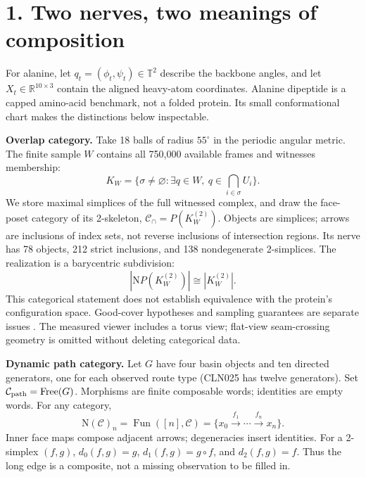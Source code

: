 \documentclass[11pt]{article}
\newcommand{\Cat}{\mathcal C}
\newcommand{\N}{\mathrm N}
\newcommand{\R}{\mathbb R}
\newcommand{\T}{\mathbb T}
\begin{document}

\newpage
\section*{1. Two nerves, two meanings of composition}
For alanine, let $q_t=(\phi_t,\psi_t)\in\T^2$ describe the backbone angles, and let
$X_t\in\R^{10\times3}$ contain the aligned heavy-atom coordinates.
Alanine dipeptide is a capped amino-acid benchmark, not a folded protein.
Its small conformational chart makes the distinctions below inspectable.

\textbf{Overlap category.}
Take 18 balls of radius $55^\circ$ in the periodic angular metric. The finite
sample $W$ contains all 750,000 available frames and witnesses membership:
\[
 K_W=\{\sigma\ne\varnothing:\exists q\in W,\ q\in\bigcap_{i\in\sigma}U_i\}.
\]
We store maximal simplices of the full witnessed complex, and draw the
face-poset category of its 2-skeleton,
$\Cat_{\cap}=P(K_W^{(2)})$. Objects are simplices; arrows are inclusions
of index sets, not reverse inclusions of intersection regions.
Its nerve has 78 objects, 212 strict inclusions, and 138 nondegenerate
2-simplices. The realization is a barycentric subdivision:
\[
 |\N P(K_W^{(2)})|\cong |K_W^{(2)}|.
\]
This categorical statement does not establish equivalence with the protein's
configuration space. Good-cover hypotheses and sampling guarantees are
separate issues \cite{may,bauer}. The measured viewer includes a torus view;
flat-view seam-crossing geometry is omitted without deleting categorical data.

\textbf{Dynamic path category.}
Let $G$ have four basin objects and ten directed generators, one for each
observed route type (CLN025 has twelve generators). Set $\Cat_{\rm path}=\mathrm{Free}(G)$.
Morphisms are finite composable words; identities are empty words.
For any category,
\[
 \N(\Cat)_n=\operatorname{Fun}([n],\Cat)
 =\{x_0\xrightarrow{f_1}\cdots\xrightarrow{f_n}x_n\}.
\]
Inner face maps compose adjacent arrows; degeneracies insert identities.
For a 2-simplex $(f,g)$, $d_0(f,g)=g$, $d_1(f,g)=g\circ f$,
and $d_2(f,g)=f$. Thus the long edge is a composite, not a missing
observation to be filled in.
\end{document}
